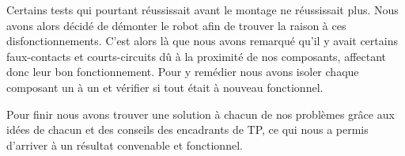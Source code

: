 Certains tests qui pourtant réussissait avant le montage ne réussissait plus. Nous avons alors décidé de démonter le robot afin de trouver la raison à ces disfonctionnements. C'est alors là que nous avons remarqué qu'il y avait certains faux-contacts et courts-circuits dû à la proximité de nos composants, affectant donc leur bon fonctionnement. Pour y remédier nous avons isoler chaque composant un à un et vérifier si tout était à nouveau fonctionnel.

Pour finir nous avons trouver une solution à chacun de nos problèmes grâce aux idées de chacun et des conseils des encadrants de TP, ce qui nous a permis d'arriver à un résultat convenable et fonctionnel.



\newpage
